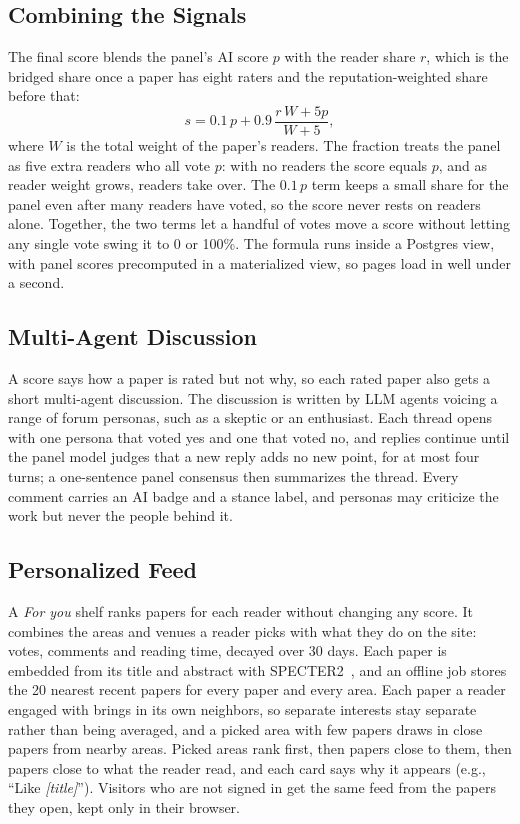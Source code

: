 \documentclass[sigconf]{acmart}
\begin{document}
\subsection{Combining the Signals}
\label{sec:combine}
The final score blends the panel's AI score $p$ with the reader share $r$, which is the bridged share once a paper has eight raters and the reputation-weighted share before that:
\[
  s = 0.1\,p + 0.9\,\frac{r\,W + 5p}{W + 5},
\]
where $W$ is the total weight of the paper's readers.
The fraction treats the panel as five extra readers who all vote $p$: with no readers the score equals $p$, and as reader weight grows, readers take over.
The $0.1\,p$ term keeps a small share for the panel even after many readers have voted, so the score never rests on readers alone.
Together, the two terms let a handful of votes move a score without letting any single vote swing it to 0 or 100\%.
The formula runs inside a Postgres view, with panel scores precomputed in a materialized view, so pages load in well under a second.

\subsection{Multi-Agent Discussion}
A score says how a paper is rated but not why, so each rated paper also gets a short multi-agent discussion.
The discussion is written by LLM agents voicing a range of forum personas, such as a skeptic or an enthusiast.
Each thread opens with one persona that voted yes and one that voted no, and replies continue until the panel model judges that a new reply adds no new point, for at most four turns; a one-sentence panel consensus then summarizes the thread.
Every comment carries an AI badge and a stance label, and personas may criticize the work but never the people behind it.

\subsection{Personalized Feed}
A \emph{For you} shelf ranks papers for each reader without changing any score.
It combines the areas and venues a reader picks with what they do on the site: votes, comments and reading time, decayed over 30 days.
Each paper is embedded from its title and abstract with SPECTER2~\cite{singh2023scirepeval}, and an offline job stores the 20 nearest recent papers for every paper and every area.
Each paper a reader engaged with brings in its own neighbors, so separate interests stay separate rather than being averaged, and a picked area with few papers draws in close papers from nearby areas.
Picked areas rank first, then papers close to them, then papers close to what the reader read, and each card says why it appears (e.g., ``Like \emph{[title]}'').
Visitors who are not signed in get the same feed from the papers they open, kept only in their browser.
\end{document}
